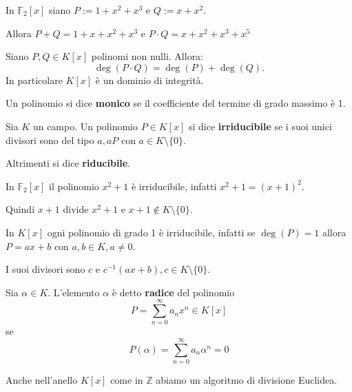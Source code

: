 \documentclass[../main.tex]{subfiles}
\begin{document}
\begin{example}
    In $\mathbb{F}_2[x]$ siano $P := 1 + x^2 + x^3$ e $Q:= x + x^2$.

    Allora $P+Q = 1 + x + x^2 + x^3$ e $P \cdot Q = x + x^2 + x^3 + x^5$
\end{example}

\begin{proposition}
    Siano $P,Q \in K[x]$ polinomi non nulli. Allora:
    \begin{equation*}
        \deg(P \cdot Q) = \deg(P) + \deg(Q).
    \end{equation*}
    In particolare $K[x]$ è un dominio di integrità.
\end{proposition}

\begin{definition}
    Un polinomio si dice \textbf{monico} se il coefficiente del termine di grado massimo è 1.
\end{definition}

\begin{definition}
    Sia $K$ un campo. Un polinomio $P \in K[x]$ si dice \textbf{irriducibile} se i suoi unici divisori sono del tipo $a, aP$ con $a \in K \setminus \{0\}$.

    Altrimenti si dice \textbf{riducibile}.
\end{definition}

\begin{example}
    In $\mathbb{F}_2[x]$ il polinomio $x^2 + 1$ è irriducibile, infatti $x^2 + 1 = (x + 1)^2$.

    Quindi $x + 1$ divide $x^2 + 1$ e $x + 1 \notin K \setminus \{0\}$.
\end{example}

\begin{example}
    In $K[x]$ ogni polinomio di grado 1 è irriducibile, infatti se $\deg(P) = 1$ allora $P = ax + b$ con $a,b \in K, a \neq 0$.

    I suoi divisori sono $c$ e $c^{-1} (ax + b), c \in K \setminus \{0\}$.
\end{example}

\begin{definition}
    Sia $\alpha \in K$. L'elemento $\alpha$ è detto \textbf{radice} del polinomio
    \[
        P = \sum_{n=0}^{\infty} a_n x^n \in K[x]
    \]
    se
    \[
        P(\alpha) = \sum_{n=0}^{\infty} a_n \alpha^n = 0
    \]
\end{definition}

Anche nell'anello $K[x]$ come in $\mathbb{Z}$ abiamo un algoritmo di divisione Euclidea.
\end{document}
